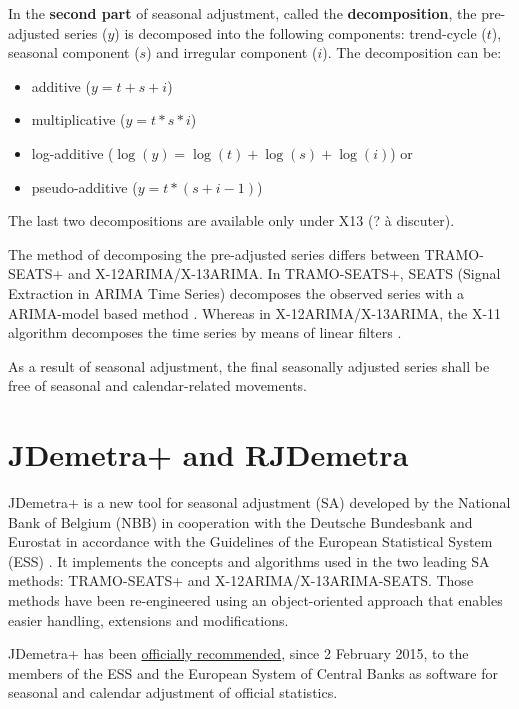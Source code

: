 \documentclass[article]{jss}
\providecommand{\tightlist}{%
  \setlength{\itemsep}{0pt}\setlength{\parskip}{0pt}}
\begin{document}
In the \textbf{second part} of seasonal adjustment, called the
\textbf{decomposition}, the pre-adjusted series (\(y\)) is decomposed
into the following components: trend-cycle (\(t\)), seasonal component
(\(s\)) and irregular component (\(i\)). The decomposition can be:

\begin{itemize}
\tightlist
\item
  additive (\(y = t + s + i\))\\
\item
  multiplicative (\(y = t * s * i\))\\
\item
  log-additive (\(\log(y) = \log(t) + \log(s) + \log(i)\)) or\\
\item
  pseudo-additive (\(y = t * (s + i - 1)\))
\end{itemize}

The last two decompositions are available only under X13 (? à discuter).

The method of decomposing the pre-adjusted series differs between
TRAMO-SEATS+ and X-12ARIMA/X-13ARIMA. In TRAMO-SEATS+, SEATS (Signal
Extraction in ARIMA Time Series) decomposes the observed series with a
ARIMA-model based method
\citep{gomez1996programs, caporello2004program}. Whereas in
X-12ARIMA/X-13ARIMA, the X-11 algorithm decomposes the time series by
means of linear filters \citep{findleyx12, ladiray1999x11en}.

As a result of seasonal adjustment, the final seasonally adjusted series
shall be free of seasonal and calendar-related movements.

\hypertarget{jdemetra-and-rjdemetra}{%
\section{JDemetra+ and RJDemetra}\label{jdemetra-and-rjdemetra}}

JDemetra+ is a new tool for seasonal adjustment (SA) developed by the
National Bank of Belgium (NBB) in cooperation with the Deutsche
Bundesbank and Eurostat in accordance with the Guidelines of the
European Statistical System (ESS) \citep{eurostat2015guidelines}. It
implements the concepts and algorithms used in the two leading SA
methods: TRAMO-SEATS+ and X-12ARIMA/X-13ARIMA-SEATS. Those methods have
been re-engineered using an object-oriented approach that enables easier
handling, extensions and modifications.

JDemetra+ has been
\href{https://ec.europa.eu/eurostat/cros/system/files/Jdemetra_\%20release.pdf}{officially
recommended}, since 2 February 2015, to the members of the ESS and the
European System of Central Banks as software for seasonal and calendar
adjustment of official statistics.
\end{document}
